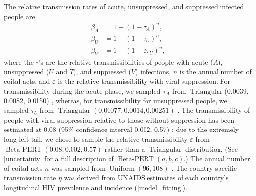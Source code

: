 \documentclass{article}
\DeclareMathOperator{\Uniform}{Uniform}
\DeclareMathOperator{\Triangular}{Triangular}
\DeclareMathOperator{\BetaPERT}{Beta-PERT}
\begin{document}
The relative transmission rates of acute, unsuppressed, and suppressed
infected people are
\begin{equation}
  \label{betas}
  \begin{split}
    \beta_A &= 1 - (1 - \tau_A)^n,
    \\
    \beta_U &= 1 - (1 - \tau_U)^n,
    \\
    \beta_V &= 1 - (1 - \varepsilon \tau_U)^n,
  \end{split}
\end{equation}
where the $\tau$'s are the relative transmissibilities of people with
acute ($A$), unsuppressed ($U$ and $T$), and suppressed ($V$)
infections, $n$ is the annual number of coital acts, and $\varepsilon$
is the relative transmissibility with viral suppression.  For
transmissibility during the acute phase, we sampled $\tau_A$ from
$\Triangular$(0.0039, 0.0082, 0.0150)
\cite{Wawer2005-us, Skarbinski2015-ni}, whereas, for transmissibility
for unsuppressed people, we sampled $\tau_U$ from
$\Triangular(0.00077, 0.0014, 0.00251)$ \cite{Hughes2012-so}.  The
transmissibility of people with viral suppression relative to those
without suppression has been estimated at 0.08 (95\% confidence
interval 0.002, 0.57) \cite{Donnell2010-xo}: due to the extremely long
left tail, we chose to sample the relative transmissibility
$\varepsilon$ from $\BetaPERT(0.08, 0.002, 0.57)$ rather than a
$\Triangular$ distribution.  (See \autoref{uncertainty} for a full
description of $\BetaPERT(a, b, c)$.)  The annual number of coital
acts $n$ was sampled from $\Uniform(96, 108)$
\cite{Wawer2005-us, Abdool_Karim2010-cm}.  The country-specific
transmission rate $\eta$ was derived from UNAIDS estimates of each
country's longitudinal HIV prevalence and incidence
(\autoref{model_fitting}).
\end{document}
